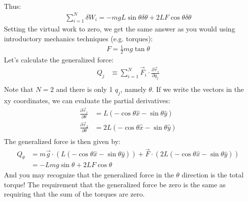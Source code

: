 \begin{example}{0pt}
\begin{align*}
\end{align*}
Thus:
\begin{align*}
\sum_{i=1}^N\delta W_i = -mgL\sin{\theta}\delta\theta+ 2LF\cos{\theta}\delta\theta
\end{align*}
Setting the virtual work to zero, we get the same answer as you would using introductory mechanics techniques (e.g. torques):
\begin{align*}
F=\frac{1}{2}mg\tan{\theta}
\end{align*}
Let's calculate the generalized force:
\begin{align*}
Q_j&\equiv \sum_{i=1}^N\vec{F}_i\cdot\frac{\partial\vec{r}_i}{\partial q_j}\nonumber\\
\end{align*}
Note that $N=2$ and there is only 1 $q_j$, namely $\theta$. If we write the vectors in the xy coordinates, we can evaluate the partial derivatives:
\begin{align*}
\frac{\partial\vec{r}_i}{\partial \theta}&=L(-\cos{\theta}\hat{x}-\sin{\theta}\hat{y}) \\
\frac{\partial\vec{r}_2}{\partial \theta}&=2L(-\cos{\theta}\hat{x}-\sin{\theta}\hat{y})\\
\end{align*}
The generalized force is then given by:
\begin{align*}
Q_\theta&=m\vec{g}\cdot\left(L(-\cos{\theta}\hat{x}-\sin{\theta}\hat{y})\right)+\vec{F}\cdot\left(2L(-\cos{\theta}\hat{x}-\sin{\theta}\hat{y})\right)\\
&=-Lmg\sin{\theta}+2LF\cos{\theta}
\end{align*}
And you may recognize that the generalized force in the $\theta$ direction is the total torque! The requirement that the generalized force be zero is the same as requiring that the sum of the torques are zero.
\end{example}

